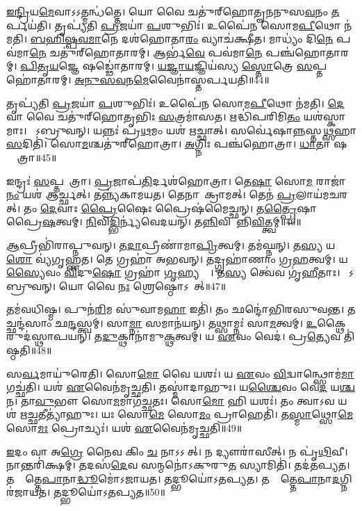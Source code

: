 \ul{𑌇}\ul{𑌨𑍍𑌦𑍍𑌰𑌿}𑌯\ul{𑌮𑍇}𑌵𑌾𑌽𑌽𑌤𑍍𑌮𑌨𑍍𑌧॑𑌤𑍍𑌤𑍇।
𑌯𑍋 𑌵𑍈 𑌚𑌤𑍁॑𑌰𑍍‌\mbox{}𑌹𑍋𑌤𑍄𑌨𑌨𑍁𑌸\ul{𑌵}𑌨𑌂 \ul{𑌤}𑌰𑍍𑌪𑌯॑𑌤𑌿।
𑌤𑍃𑌪𑍍𑌯॑𑌤𑌿 \ul{𑌪𑍍𑌰}𑌜𑌯𑌾॑ \ul{𑌪}𑌶𑍁𑌭𑌿𑌃॑।
𑌉𑌪𑍈॑𑌨 𑌸𑍋𑌮\ul{𑌪𑍀}𑌥𑍋 𑌨॑𑌮𑌤𑌿।
\ul{𑌬}\ul{𑌹𑌿}\ul{𑌷𑍍𑌪}\ul{𑌵}\ul{𑌮𑌾}𑌨𑍇 𑌦𑌶॑𑌹𑍋𑌤𑌾\ul{𑌰𑌂} 𑌵𑍍𑌯𑌾𑌚॑𑌕𑍍𑌷𑍀𑌤।
𑌮𑌾𑌧𑍍𑌯𑌂॑ 𑌦𑌿\ul{𑌨𑍇} 𑌪𑌵॑𑌮𑌾\ul{𑌨𑍇} 𑌚𑌤𑍁॑𑌰𑍍‌\mbox{}𑌹𑍋𑌤𑌾𑌰𑌮𑍍।
𑌆𑌰𑍍𑌭॑\ul{𑌵𑍇} 𑌪𑌵॑𑌮𑌾\ul{𑌨𑍇} 𑌪𑌞𑍍𑌚॑𑌹𑍋𑌤𑌾𑌰𑌮𑍍।
\ul{𑌪𑌿}\ul{𑌤𑍃}\ul{𑌯}𑌜𑍍𑌞𑍇 𑌷𑌡𑍍𑌢𑍋॑𑌤𑌾𑌰𑌮𑍍।
\ul{𑌯}\ul{𑌜𑍍𑌞𑌾}\ul{𑌯}𑌜𑍍𑌞𑌿𑌯॑𑌸𑍍𑌯 \ul{𑌸𑍍𑌤𑍋}𑌤𑍍𑌰𑍇 \ul{𑌸}𑌪𑍍𑌤𑌹𑍋॑𑌤𑌾𑌰𑌮𑍍।
\ul{𑌅}\ul{𑌨𑍁}\ul{𑌸}\ul{𑌵}𑌨\ul{𑌮𑍇}𑌵𑍈𑌨𑌾॑𑌸𑍍𑌤𑌰𑍍𑌪𑌯𑌤𑌿॥44॥

𑌤𑍃𑌪𑍍𑌯॑𑌤𑌿 \ul{𑌪𑍍𑌰}𑌜𑌯𑌾॑ \ul{𑌪}𑌶𑍁𑌭𑌿𑌃॑।
𑌉𑌪𑍈॑𑌨 𑌸𑍋𑌮\ul{𑌪𑍀}𑌥𑍋 𑌨॑𑌮𑌤𑌿।
\ul{𑌦𑍇}𑌵𑌾 𑌵𑍈 𑌚𑌤𑍁॑𑌰𑍍‌\mbox{}𑌹𑍋𑌤𑍃𑌭𑌿𑌃 \ul{𑌸}𑌤𑍍𑌰𑌮𑌾॑𑌸𑌤।
𑌋𑌦𑍍𑌧𑌿॑𑌪𑌰𑌿𑌮𑌿\ul{𑌤𑌂} 𑌯𑌶॑𑌸𑍍𑌕𑌾𑌮𑌾𑌃।
𑌤𑍇᳚𑌽𑌬𑍍𑌰𑍁𑌵𑌨𑍍।
𑌯𑌨𑍍𑌨𑌃॑ 𑌪𑍍𑌰\ul{𑌥}𑌮𑌂 𑌯𑌶॑ \ul{𑌋}𑌚𑍍𑌛𑌾𑌤𑍍।
𑌸𑌰𑍍𑌵𑍇॑𑌷𑌾\ul{𑌨𑍍𑌨}𑌸𑍍𑌤\ul{𑌥𑍍𑌸}𑌹𑌾\ul{𑌸}𑌦𑌿𑌤𑌿॑।
𑌸𑍋\ul{𑌮}𑌶𑍍𑌚𑌤𑍁॑𑌰𑍍‌\mbox{}𑌹𑍋𑌤𑍍𑌰𑌾।
\ul{𑌅}𑌗𑍍𑌨𑌿𑌃 𑌪𑌞𑍍𑌚॑𑌹𑍋𑌤𑍍𑌰𑌾।
\ul{𑌧𑌾}𑌤𑌾 𑌷𑌡𑍍𑌢𑍋᳚𑌤𑍍𑌰𑌾॥45॥

𑌇𑌨𑍍𑌦𑍍𑌰𑌃॑ \ul{𑌸}𑌪𑍍𑌤𑌹𑍋᳚𑌤𑍍𑌰𑌾।
\ul{𑌪𑍍𑌰}𑌜𑌾𑌪॑\ul{𑌤𑌿}𑌰𑍍𑌦𑌶॑𑌹𑍋𑌤𑍍𑌰𑌾।
𑌤𑍇\ul{𑌷𑌾}\ul{} 𑌸𑍋\ul{𑌮}\ul{} 𑌰𑌾𑌜𑌾॑\ul{𑌨𑌂} 𑌯𑌶॑ 𑌆𑌰𑍍𑌚𑍍𑌛𑌤𑍍।
𑌤𑌨𑍍𑌨𑍍𑌯॑𑌕𑌾𑌮𑌯𑌤।
𑌤𑍇𑌨𑌾𑌪𑌾᳚𑌕𑍍𑌰𑌾𑌮𑌤𑍍।
𑌤𑍇𑌨॑ \ul{𑌪𑍍𑌰}𑌲𑌾𑌯॑𑌮𑌚𑌰𑌤𑍍।
𑌤𑌂 \ul{𑌦𑍇}𑌵𑌾𑌃 \ul{𑌪𑍍𑌰𑍈}𑌷𑍈𑌃 𑌪𑍍𑌰𑍈𑌷॑𑌮𑍈𑌚𑍍𑌛𑌨𑍍।
𑌤\ul{𑌤𑍍𑌪𑍍𑌰𑍈}𑌷𑌾𑌣𑌾𑌂᳚ 𑌪𑍍𑌰𑍈\ul{𑌷}𑌤𑍍𑌵𑌮𑍍।
\ul{𑌨𑌿}𑌵𑌿\ul{𑌦𑍍𑌭𑌿}𑌰𑍍𑌨𑍍𑌯॑𑌵𑍇𑌦𑌯𑌨𑍍।
𑌤\ul{𑌨𑍍𑌨𑌿}𑌵𑌿𑌦𑌾᳚𑌨𑍍𑌨𑌿\ul{𑌵𑌿}𑌤𑍍𑌤𑍍𑌵𑌮𑍍॥46॥

\ul{𑌆}𑌪𑍍𑌰𑍀𑌭𑌿॑𑌰𑌾𑌪𑍍𑌨𑍁𑌵𑌨𑍍।
𑌤\ul{𑌦𑌾}𑌪𑍍𑌰𑍀𑌣𑌾॑𑌮𑌾\ul{𑌪𑍍𑌰𑌿}𑌤𑍍𑌵𑌮𑍍।
𑌤𑌮॑𑌘𑍍𑌨𑌨𑍍।
𑌤\ul{𑌸𑍍𑌯} 𑌯\ul{𑌶𑍋} 𑌵𑍍𑌯॑𑌗𑍃𑌹𑍍𑌣𑌤।
𑌤𑍇 𑌗𑍍𑌰𑌹𑌾॑ 𑌅𑌭𑌵𑌨𑍍।
𑌤𑌦𑍍𑌗𑍍𑌰𑌹𑌾॑𑌣𑌾𑌂 𑌗𑍍𑌰\ul{𑌹}𑌤𑍍𑌵𑌮𑍍।
𑌯\ul{𑌸𑍍𑌯𑍈}𑌵𑌂 \ul{𑌵𑌿}𑌦𑍁\ul{𑌷𑍋} 𑌗𑍍𑌰𑌹𑌾॑ \ul{𑌗𑍃}𑌹𑍍𑌯𑌨𑍍𑌤𑍇᳚।
𑌤\ul{𑌸𑍍𑌯} 𑌤𑍍𑌵𑍇॑𑌵 𑌗𑍃॑\ul{𑌹𑍀}𑌤𑌾𑌃।
𑌤𑍇᳚𑌽𑌬𑍍𑌰𑍁𑌵𑌨𑍍।
𑌯𑍋 𑌵𑍈 \ul{𑌨𑌃} 𑌶𑍍𑌰𑍇𑌷𑍍𑌠𑍋\-𑌽𑌭𑍂᳚𑌤𑍍॥47॥

𑌤𑌮॑𑌵𑌧𑌿𑌷𑍍𑌮।
𑌪𑍁𑌨॑\ul{𑌰𑌿}𑌮 𑌸𑍁॑𑌵𑌾𑌮\ul{𑌹𑌾} 𑌇𑌤𑌿॑।
𑌤𑌂 𑌛𑌨𑍍𑌦𑍋॑𑌭𑌿𑌰𑌸𑍁𑌵𑌨𑍍𑌤।
𑌤𑌚𑍍𑌛𑌨𑍍𑌦॑𑌸𑌾𑌂 𑌛\ul{𑌨𑍍𑌦}𑌸𑍍𑌤𑍍𑌵𑌮𑍍।
𑌸𑌾\ul{𑌮𑍍𑌨𑌾} 𑌸𑌮𑌾𑌨॑𑌯𑌨𑍍।
𑌤𑌥𑍍𑌸𑌾𑌮𑍍𑌨𑌃॑ 𑌸𑌾\ul{𑌮}𑌤𑍍𑌵𑌮𑍍।
\ul{𑌉}𑌕𑍍𑌥𑍈𑌰𑍁𑌦॑𑌸𑍍𑌥𑌾𑌪𑌯𑌨𑍍।
𑌤\ul{𑌦𑍁}𑌕𑍍𑌥𑌾𑌨𑌾॑𑌮𑍁\ul{𑌕𑍍𑌥}𑌤𑍍𑌵𑌮𑍍।
𑌯 \ul{𑌏}𑌵𑌂 𑌵𑍇𑌦॑।
𑌪𑍍𑌰\ul{𑌤𑍍𑌯𑍇}𑌵 𑌤𑌿॑𑌷𑍍𑌠𑌤𑌿॥48॥

𑌸\ul{𑌰𑍍𑌵}𑌮𑌾𑌯𑍁॑𑌰𑍇𑌤𑌿।
𑌸𑍋\ul{𑌮𑍋} 𑌵𑍈 𑌯𑌶𑌃॑।
𑌯 \ul{𑌏}𑌵𑌂 \ul{𑌵𑌿}𑌦𑍍𑌵𑌾𑌨𑍍𑌥𑍍𑌸𑍋𑌮॑\ul{𑌮𑌾}𑌗𑌚𑍍𑌛॑𑌤𑌿।
𑌯𑌶॑ \ul{𑌏}𑌵𑍈𑌨॑𑌮𑍃𑌚𑍍𑌛𑌤𑌿।
𑌤𑌸𑍍𑌮𑌾॑𑌦𑌾𑌹𑍁𑌃।
𑌯\ul{𑌶𑍍𑌚𑍈}𑌵𑌂 𑌵𑍇\ul{𑌦} 𑌯\ul{𑌶𑍍𑌚} 𑌨।
𑌤𑌾\ul{𑌵𑍁}𑌭𑍗 𑌸𑍋\ul{𑌮}𑌮𑌾𑌗॑𑌚𑍍𑌛𑌤𑌃।
𑌸𑍋\ul{𑌮𑍋} 𑌹𑌿 𑌯𑌶𑌃॑।
𑌤𑌂 𑌤𑍍𑌵𑌾𑌽𑌵 𑌯𑌶॑ 𑌋\ul{𑌚𑍍𑌛}𑌤𑍀𑌤𑍍𑌯𑌾॑𑌹𑍁𑌃।
𑌯𑌃 𑌸𑍋\ul{𑌮𑍇} 𑌸𑍋\ul{𑌮𑌂} 𑌪𑍍𑌰𑌾𑌹𑍇𑌤𑌿॑।
𑌤\ul{𑌸𑍍𑌮𑌾}𑌥𑍍𑌸𑍋\ul{𑌮𑍇} 𑌸𑍋\ul{𑌮𑌃} 𑌪𑍍𑌰𑍋𑌚𑍍𑌯𑌃॑।
𑌯𑌶॑ \ul{𑌏}𑌵𑍈𑌨॑𑌮𑍃𑌚𑍍𑌛𑌤𑌿॥49॥\anuvakamend[\ul{𑌅}\ul{𑌭𑌿}\ul{𑌷𑍁}𑌣𑍍𑌵𑌨𑍍𑌤𑌿॑ \ul{𑌸}𑌪𑍍𑌤𑌹𑍋॑𑌤𑌾 𑌤𑌰𑍍𑌪𑌯\ul{𑌤𑌿} 𑌷𑌡𑍍𑌢𑍋᳚𑌤𑍍𑌰𑌾 𑌨𑌿\ul{𑌵𑌿}𑌤𑍍𑌤𑍍𑌵𑌮𑌭𑍂᳚𑌤𑍍𑌤𑌿𑌷𑍍𑌠\ul{𑌤𑌿} 𑌪𑍍𑌰𑌾𑌹𑍇\ul{𑌤𑌿} 𑌦𑍍𑌵𑍇 𑌚॑]

\ul{𑌇}𑌦𑌂 𑌵𑌾 𑌅\ul{𑌗𑍍𑌰𑍇} 𑌨𑍈𑌵 𑌕𑌿𑌂 \ul{𑌚} 𑌨𑌾𑌽𑌽𑌸𑍀᳚𑌤𑍍।
𑌨 𑌦𑍍𑌯𑍗𑌰𑌾॑𑌸𑍀𑌤𑍍।
𑌨 𑌪𑍃॑\ul{𑌥𑌿}𑌵𑍀।
𑌨𑌾𑌨𑍍𑌤𑌰𑌿॑𑌕𑍍𑌷𑌮𑍍।
𑌤𑌦𑌸॑\ul{𑌦𑍇}𑌵 𑌸𑌨𑍍𑌮𑌨𑍋॑\-𑌽𑌕𑍁𑌰𑍁\ul{𑌤} 𑌸𑍍𑌯𑌾𑌮𑌿𑌤𑌿॑।
𑌤𑌦॑𑌤𑌪𑍍𑌯𑌤।
𑌤𑌸𑍍𑌮𑌾᳚𑌤𑍍𑌤𑍇\ul{𑌪𑌾}𑌨𑌾\ul{𑌦𑍍𑌧𑍂}𑌮𑍋॑\-𑌽𑌜𑌾𑌯𑌤।
𑌤𑌦𑍍𑌭𑍂𑌯𑍋॑\-𑌽𑌤𑌪𑍍𑌯𑌤।
𑌤𑌸𑍍𑌮𑌾᳚𑌤𑍍𑌤𑍇\ul{𑌪𑌾}𑌨𑌾\ul{𑌦}𑌗𑍍𑌨𑌿𑌰॑𑌜𑌾𑌯𑌤।
𑌤𑌦𑍍𑌭𑍂𑌯𑍋॑\-𑌽𑌤𑌪𑍍𑌯𑌤॥50॥

